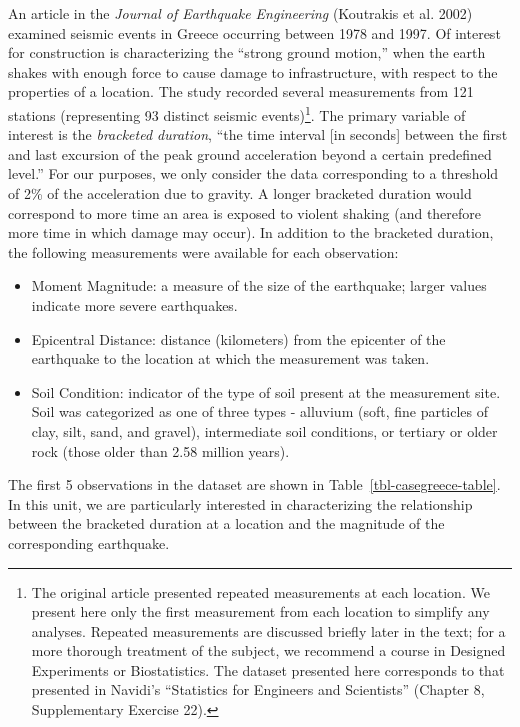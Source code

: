 \documentclass[
  letterpaper,
  DIV=11,
  numbers=noendperiod]{scrreprt}
\providecommand{\tightlist}{%
  \setlength{\itemsep}{0pt}\setlength{\parskip}{0pt}}\usepackage{longtable,booktabs,array}
\theoremstyle{plain}
\theoremstyle{definition}
\theoremstyle{definition}
\theoremstyle{remark}
\begin{document}
An article in the \emph{Journal of Earthquake Engineering} (Koutrakis et
al. 2002) examined seismic events in Greece occurring between 1978 and
1997. Of interest for construction is characterizing the ``strong ground
motion,'' when the earth shakes with enough force to cause damage to
infrastructure, with respect to the properties of a location. The study
recorded several measurements from 121 stations (representing 93
distinct seismic events)\footnote{The original article presented
  repeated measurements at each location. We present here only the first
  measurement from each location to simplify any analyses. Repeated
  measurements are discussed briefly later in the text; for a more
  thorough treatment of the subject, we recommend a course in Designed
  Experiments or Biostatistics. The dataset presented here corresponds
  to that presented in Navidi's ``Statistics for Engineers and
  Scientists'' (Chapter 8, Supplementary Exercise 22).}. The primary
variable of interest is the \emph{bracketed duration}, ``the time
interval {[}in seconds{]} between the first and last excursion of the
peak ground acceleration beyond a certain predefined level.'' For our
purposes, we only consider the data corresponding to a threshold of 2\%
of the acceleration due to gravity. A longer bracketed duration would
correspond to more time an area is exposed to violent shaking (and
therefore more time in which damage may occur). In addition to the
bracketed duration, the following measurements were available for each
observation:

\begin{itemize}
\tightlist
\item
  Moment Magnitude: a measure of the size of the earthquake; larger
  values indicate more severe earthquakes.
\item
  Epicentral Distance: distance (kilometers) from the epicenter of the
  earthquake to the location at which the measurement was taken.
\item
  Soil Condition: indicator of the type of soil present at the
  measurement site. Soil was categorized as one of three types -
  alluvium (soft, fine particles of clay, silt, sand, and gravel),
  intermediate soil conditions, or tertiary or older rock (those older
  than 2.58 million years).
\end{itemize}

The first 5 observations in the dataset are shown in
Table~\ref{tbl-casegreece-table}. In this unit, we are particularly
interested in characterizing the relationship between the bracketed
duration at a location and the magnitude of the corresponding
earthquake.
\end{document}
